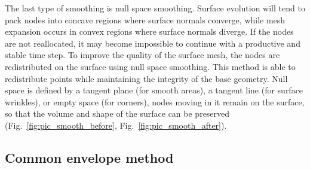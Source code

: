 \documentclass[
11pt,%
tightenlines,%
twoside,%
onecolumn,%
nofloats,%
nobibnotes,%
nofootinbib,%
superscriptaddress,%
noshowpacs,%
centertags]%
{revtex4}
\begin{document}
The last type of smoothing is null space smoothing.
Surface evolution will tend to pack nodes into concave regions where surface normals converge, while mesh expansion occurs in convex regions where surface normals diverge.
If the nodes are not reallocated, it may become impossible to continue with a productive and stable time step.
To improve the quality of the surface mesh, the nodes are redistributed on the surface using null space smoothing.
This method is able to redistribute points while maintaining the integrity of the base geometry.
Null space is defined by a tangent plane (for smooth areas), a tangent line (for surface wrinkles), or empty space (for corners), nodes moving in it remain on the surface, so that the volume and shape of the surface can be preserved (Fig.~\ref{fig:pic_smooth_before}, Fig.~\ref{fig:pic_smooth_after}).

\subsection{Common envelope method}
\end{document}
